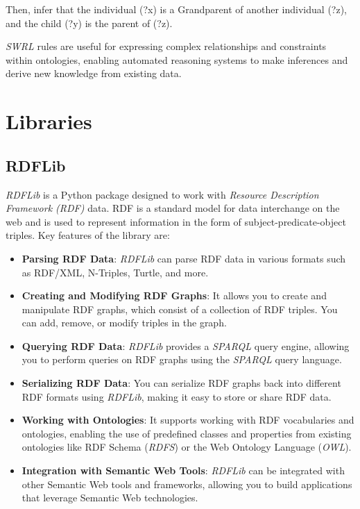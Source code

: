	Then, infer that the individual (?x) is a Grandparent of another individual (?z), and the child (?y) is the parent of (?z).
	
	\textit{SWRL} rules are useful for expressing complex relationships and constraints within ontologies, enabling automated reasoning systems to make inferences and derive new knowledge from existing data.
	\section{Libraries}
	\label{sec:Libraries}
\subsection{RDFLib}
\label{sec:RDFLib}
\textit{RDFLib} \cite{Krech_RDFLib_2023} is a Python package designed to work with \textit{Resource Description Framework (RDF)} data. RDF is a standard model for data interchange on the web and is used to represent information in the form of subject-predicate-object triples. Key features of the library are:

\begin{itemize}
    \item \textbf{Parsing RDF Data}: \textit{RDFLib} can parse RDF data in various formats such as RDF/XML, N-Triples, Turtle, and more.
    
    \item \textbf{Creating and Modifying RDF Graphs}: It allows you to create and manipulate RDF graphs, which consist of a collection of RDF triples. You can add, remove, or modify triples in the graph.
    
    \item \textbf{Querying RDF Data}: \textit{RDFLib} provides a \textit{SPARQL} query engine, allowing you to perform queries on RDF graphs using the \textit{SPARQL} query language.
    
    \item \textbf{Serializing RDF Data}: You can serialize RDF graphs back into different RDF formats using \textit{RDFLib}, making it easy to store or share RDF data.
    
    \item \textbf{Working with Ontologies}: It supports working with RDF vocabularies and ontologies, enabling the use of predefined classes and properties from existing ontologies like RDF Schema (\textit{RDFS}) or the Web Ontology Language (\textit{OWL}).
    
    \item \textbf{Integration with Semantic Web Tools}: \textit{RDFLib} can be integrated with other Semantic Web tools and frameworks, allowing you to build applications that leverage Semantic Web technologies.
\end{itemize}


